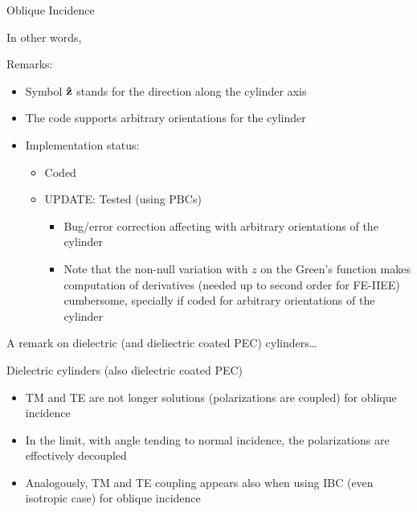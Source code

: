 \begin{frame}[allowframebreaks]{Oblique Incidence}
\begin{block}{In other words,}
      \vbs
      
      Remarks:
      \begin{itemize}
      \item Symbol $\mathbf{\hat{z}}$ stands for the direction along the
        cylinder axis
      \item The code supports arbitrary orientations for the cylinder
      \end{itemize}
    \end{block}

    \begin{itemize}
    \item Implementation status:
      \begin{itemize}
      \item Coded
      \item \alert{UPDATE: Tested (using PBCs)}
        \begin{itemize}
        \item Bug/error correction affecting with arbitrary orientations of the cylinder
        \item Note that the non-null variation with $z$ on the Green's
          function makes computation of derivatives (needed up to
          second order for FE-IIEE) cumbersome, specially if coded for
          arbitrary orientations of the cylinder
        \end{itemize}
      \end{itemize}
    \end{itemize}
      

    \framebreak %

   \large{A remark on dielectric (and dieliectric coated PEC) cylinders\ldots}
    
   \begin{block}{Dielectric cylinders (also dielectric coated PEC)}
     \begin{itemize}
     \item TM and TE are not longer solutions (\alert{polarizations are
       coupled})  for oblique incidence

   \item In the limit, with angle tending to normal incidence, the
     polarizations are effectively decoupled

   \item Analogously, TM and TE coupling appears also when using IBC (even
     isotropic case) for oblique incidence

     \end{itemize}
   \end{block}

  
\end{frame}
  
